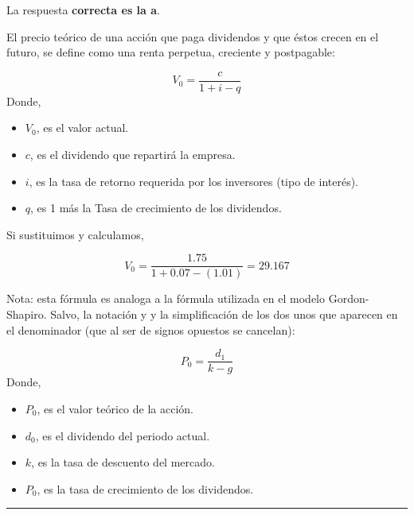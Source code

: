 \documentclass[
  letterpaper,
  DIV=11,
  numbers=noendperiod]{scrreprt}
\begin{document}
\begin{tcolorbox}[enhanced jigsaw, left=2mm, opacityback=0, colback=white, breakable, arc=.35mm, bottomrule=.15mm, rightrule=.15mm, toprule=.15mm, leftrule=.75mm, colframe=quarto-callout-tip-color-frame]
\begin{minipage}[t]{5.5mm}
\textcolor{quarto-callout-tip-color}{\faLightbulb}
\end{minipage}%
\begin{minipage}[t]{\textwidth - 5.5mm}

La respuesta \textbf{correcta es la a}.

El precio teórico de una acción que paga dividendos y que éstos crecen
en el futuro, se define como una renta perpetua, creciente y
postpagable:

\[V_0=\frac{c}{1+i-q}\] Donde,

\begin{itemize}
\item
  \(V_0\), es el valor actual.
\item
  \(c\), es el dividendo que repartirá la empresa.
\item
  \(i\), es la tasa de retorno requerida por los inversores (tipo de
  interés).
\item
  \(q\), es 1 más la Tasa de crecimiento de los dividendos.
\end{itemize}

Si sustituimos y calculamos,

\[V_0=\frac{1.75}{1+0.07-(1.01)}=29.167\]

Nota: esta fórmula es analoga a la fórmula utilizada en el modelo
Gordon-Shapiro. Salvo, la notación y y la simplificación de los dos unos
que aparecen en el denominador (que al ser de signos opuestos se
cancelan):

\[P_0=\frac{d_1}{k-g}\] Donde,

\begin{itemize}
\item
  \(P_0\), es el valor teórico de la acción.
\item
  \(d_0\), es el dividendo del periodo actual.
\item
  \(k\), es la tasa de descuento del mercado.
\item
  \(P_0\), es la tasa de crecimiento de los dividendos.
\end{itemize}

\end{minipage}%
\end{tcolorbox}

\begin{center}\rule{0.5\linewidth}{0.5pt}\end{center}
\end{document}

